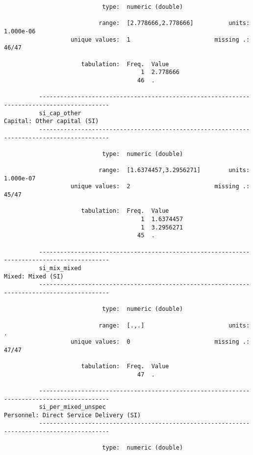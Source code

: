 \documentclass{article}
\begin{document}
\begin{verbatim}
                            type:  numeric (double)
          
                           range:  [2.778666,2.778666]          units:  1.000e-06
                   unique values:  1                        missing .:  46/47
          
                      tabulation:  Freq.  Value
                                       1  2.778666
                                      46  .
          
          ------------------------------------------------------------------------------------------
          si_cap_other                                                   Capital: Other capital (SI)
          ------------------------------------------------------------------------------------------
          
                            type:  numeric (double)
          
                           range:  [1.6374457,3.2956271]        units:  1.000e-07
                   unique values:  2                        missing .:  45/47
          
                      tabulation:  Freq.  Value
                                       1  1.6374457
                                       1  3.2956271
                                      45  .
          
          ------------------------------------------------------------------------------------------
          si_mix_mixed                                                             Mixed: Mixed (SI)
          ------------------------------------------------------------------------------------------
          
                            type:  numeric (double)
          
                           range:  [.,.]                        units:  .
                   unique values:  0                        missing .:  47/47
          
                      tabulation:  Freq.  Value
                                      47  .
          
          ------------------------------------------------------------------------------------------
          si_per_mixed_unspec                                Personnel: Direct Service Delivery (SI)
          ------------------------------------------------------------------------------------------
          
                            type:  numeric (double)
          

\end{verbatim}
\end{document}
